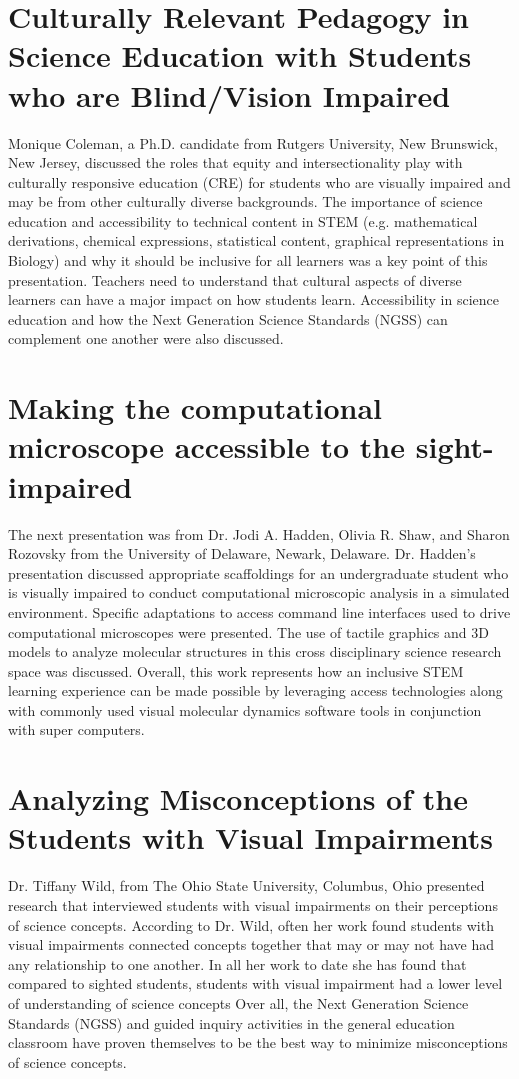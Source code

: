 \documentclass[11.5pt]{sig-alternate} %
\begin{document}
\begin{large}
\section*{Culturally Relevant Pedagogy in Science Education with Students who are Blind/Vision Impaired}
Monique Coleman, a Ph.D. candidate from Rutgers University, New Brunswick, New Jersey, discussed the roles that equity and intersectionality play with culturally responsive education (CRE) for students who are visually impaired and may be from other culturally diverse backgrounds. The importance of science education and accessibility to technical content in STEM (e.g. mathematical derivations, chemical expressions, statistical content, graphical representations in Biology) and why it should be inclusive for all learners was a key point of this presentation. Teachers need to understand that cultural aspects of diverse learners can have a major impact on how students learn. Accessibility in science education and how the Next Generation Science Standards (NGSS) can complement one another were also discussed.


\section*{Making the computational microscope accessible to the sight-impaired}
The next presentation was from Dr. Jodi A. Hadden, Olivia R. Shaw, and Sharon Rozovsky from the University of Delaware, Newark, Delaware. Dr. Hadden’s presentation discussed appropriate scaffoldings for an undergraduate student who is visually impaired to conduct computational microscopic analysis in a simulated environment. Specific adaptations to access command line interfaces used to drive computational microscopes were presented. The use of tactile graphics and 3D models to analyze molecular structures in this cross disciplinary science research space was discussed. Overall, this work represents how an inclusive STEM learning experience can be made possible by leveraging access technologies along with commonly used visual molecular dynamics software tools in conjunction with super computers. 


\section*{Analyzing Misconceptions of the Students with Visual Impairments}
Dr. Tiffany Wild, from The Ohio State University, Columbus, Ohio presented research that interviewed students with visual impairments on their perceptions of science concepts. According to Dr. Wild, often her work found students with visual impairments connected concepts together that may or may not have had any relationship to one another. In all her work to date she has found that compared to sighted students, students with visual impairment had a lower level of understanding of science concepts Over all, the Next Generation Science Standards (NGSS) and guided inquiry activities in the general education classroom have proven themselves to be the best way to minimize misconceptions of science concepts.



\end{large}
\end{document}
